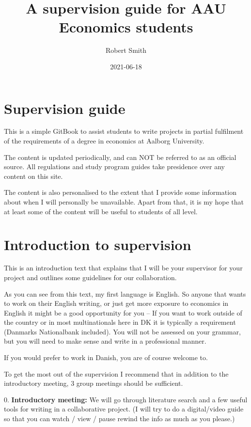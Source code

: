 \documentclass[
]{book}
\title{A supervision guide for AAU Economics students}
\author{Robert Smith}
\date{2021-06-18}
\begin{document}
\maketitle

{
\setcounter{tocdepth}{1}
\tableofcontents
}
\hypertarget{supervision-guide}{%
\chapter{Supervision guide}\label{supervision-guide}}

This is a simple GitBook to assist students to write projects in partial fulfilment of the requirements of a degree in economics at Aalborg University.

The content is updated periodically, and can NOT be referred to as an official source. All regulations and study program guides take presidence over any content on this site.

The content is also personalised to the extent that I provide some information about when I will personally be unavailable. Apart from that, it is my hope that at least some of the content will be useful to students of all level.

\hypertarget{introduction-to-supervision}{%
\chapter{Introduction to supervision}\label{introduction-to-supervision}}

This is an introduction text that explains that I will be your
supervisor for your project and outlines some guidelines for our
collaboration.

As you can see from this text, my first language is English. So anyone
that wants to work on their English writing, or just get more exposure
to economics in English it might be a good opportunity for you -- If you
want to work outside of the country or in most multinationals here in DK
it is typically a requirement (Danmarks Nationalbank included). You will
not be assessed on your grammar, but you will need to make sense and
write in a professional manner.

If you would prefer to work in Danish, you are of course welcome to.

To get the most out of the supervision I recommend that in addition to
the introductory meeting, 3 group meetings should be sufficient.

0. \textbf{Introductory meeting:} We will go through literature search and a
few useful tools for writing in a collaborative project. (I will try to
do a digital/video guide so that you can watch / view / pause rewind the
info as much as you please.)
\end{document}
